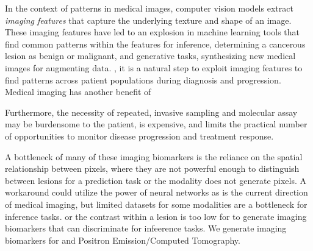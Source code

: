 
In the context of patterns in medical images, computer vision models extract \textit{imaging features} that capture the underlying texture and shape of an image.  These imaging features have led to an explosion in machine learning tools that find common patterns within the features for inference, determining a cancerous lesion as benign or malignant, and generative tasks, synthesizing new medical images for augmenting data. , it is a natural step to exploit imaging features to find patterns across patient populations during diagnosis and progression.  Medical imaging has another benefit of

Furthermore, the necessity of repeated, invasive sampling and molecular assay may be burdensome to the patient, is expensive, and limits the practical number of opportunities to monitor disease progression and treatment response.   

A bottleneck of many of these imaging biomarkers is the reliance on the spatial relationship between pixels, where they are not powerful enough to distinguish between lesions for a prediction task or the modality does not generate pixels.  A workaround could utilize the power of neural networks as is the current direction of medical imaging, but limited datasets for some modalities are a bottleneck for inference tasks.   or the contrast within a lesion is too low for to generate imaging biomarkers that can discriminate for infeerence tasks.  We generate imaging biomarkers for and Positron Emission/Computed Tomography.    








